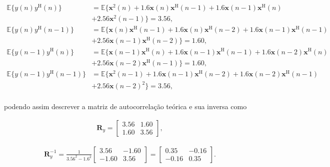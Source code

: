 \begin{enumerate}
        \begin{align*}
            \mathbb{E}\{y(n)y^{\text{H}}(n)\} &= \mathbb{E}\{ \mathbf{x}^{2}(n) + 1.6 \mathbf{x}(n) \mathbf{x}^{\text{H}}(n - 1) + 1.6 \mathbf{x}(n - 1) \mathbf{x}^{\text{H}} (n) \\
            &+ 2.56 \mathbf{x}^{2}(n - 1) \} = 3.56, \\
            \mathbb{E}\{y(n)y^{\text{H}}(n - 1)\} &= \mathbb{E}\{ \mathbf{x}(n) \mathbf{x}^{\text{H}}(n - 1) + 1.6 \mathbf{x}(n) \mathbf{x}^{\text{H}}(n - 2) + 1.6 \mathbf{x}(n - 1) \mathbf{x}^{\text{H}} (n - 1) \\ 
            &+ 2.56 \mathbf{x}(n - 1) \mathbf{x}^{\text{H}}(n - 2) \} = 1.60, \\
            \mathbb{E}\{y(n - 1)y^{\text{H}}(n)\} &= \mathbb{E}\{ \mathbf{x}(n - 1) \mathbf{x}^{\text{H}}(n) + 1.6 \mathbf{x}(n - 1) \mathbf{x}^{\text{H}}(n - 1) + 1.6 \mathbf{x}(n - 2) \mathbf{x}^{\text{H}} (n) \\ 
            &+ 2.56 \mathbf{x}(n - 2) \mathbf{x}^{\text{H}}(n - 1) \} = 1.60, \\
            \mathbb{E}\{y(n - 1)y^{\text{H}}(n - 1)\} &= \mathbb{E}\{ \mathbf{x}^{2}(n - 1) + 1.6 \mathbf{x}(n - 1) \mathbf{x}^{\text{H}}(n - 2) + 1.6 \mathbf{x}(n - 2) \mathbf{x}^{\text{H}} (n - 1) \\ 
            &+ 2.56 \mathbf{x}(n - 2)^{2} \} = 3.56, \\
        \end{align*}
        
        podendo assim descrever a matriz de autocorrelação teórica e sua inversa como
        
        \begin{align}
            \mathbf{R}_{y} =
            \begin{bmatrix}
                3.56 & 1.60 \\
                1.60 & 3.56
            \end{bmatrix},
        \end{align}
        
        \begin{align}
            \mathbf{R}^{-1}_{y} = \frac{1}{3.56^{2} - 1.6^{2}}
            \begin{bmatrix}
                3.56 &  -1.60 \\
                -1.60 & 3.56
            \end{bmatrix} =
            \begin{bmatrix}
                0.35 &  -0.16 \\
                -0.16 & 0.35
            \end{bmatrix}.
        \end{align}
        

\end{enumerate}
